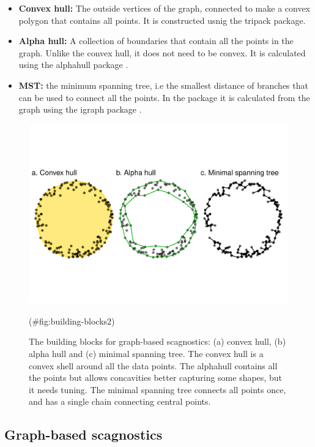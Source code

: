 \begin{itemize}
\item
  \textbf{Convex hull:} The outside vertices of the graph, connected to
  make a convex polygon that contains all points. It is constructed
  usnig the tripack package.
\item
  \textbf{Alpha hull:} A collection of boundaries that contain all the
  points in the graph. Unlike the convex hull, it does not need to be
  convex. It is calculated using the alphahull package
  \citep{alphahull}.
\item
  \textbf{MST:} the minimum spanning tree, i.e the smallest distance of
  branches that can be used to connect all the points. In the package it
  is calculated from the graph using the igraph package \citep{igraph}.
\end{itemize}

\begin{Schunk}
\begin{figure}
\includegraphics[width=1\linewidth]{mason-lee-laa-cook_files/figure-latex/building-blocks2-1} \caption[The building blocks for graph-based scagnostics]{The building blocks for graph-based scagnostics: (a) convex hull, (b) alpha hull and (c) minimal spanning tree. The convex hull is a convex shell around all the data points. The alphahull contains all the points but allows concavities better capturing some shapes, but it needs tuning. The minimal spanning tree connects all points once, and has a single chain connecting central points.}(\#fig:building-blocks2)
\end{figure}
\end{Schunk}

\hypertarget{graph-based-scagnostics}{%
\subsection{Graph-based scagnostics}\label{graph-based-scagnostics}}

